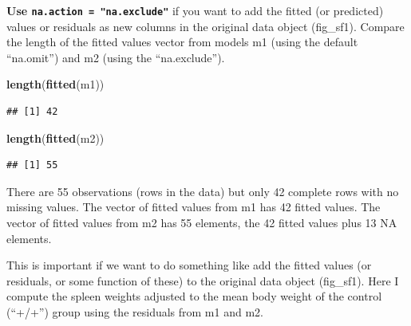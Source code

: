 \documentclass[]{book}
\newenvironment{Shaded}{\begin{snugshade}}{\end{snugshade}}
\newcommand{\KeywordTok}[1]{\textcolor[rgb]{0.13,0.29,0.53}{\textbf{#1}}}
\newcommand{\NormalTok}[1]{#1}
\begin{document}
\textbf{Use \texttt{na.action\ =\ "na.exclude"}} if you want to add the fitted (or predicted) values or residuals as new columns in the original data object (fig\_sf1). Compare the length of the fitted values vector from models m1 (using the default ``na.omit'') and m2 (using the ``na.exclude'').

\begin{Shaded}
\begin{Highlighting}[]
\KeywordTok{length}\NormalTok{(}\KeywordTok{fitted}\NormalTok{(m1))}
\end{Highlighting}
\end{Shaded}

\begin{verbatim}
## [1] 42
\end{verbatim}

\begin{Shaded}
\begin{Highlighting}[]
\KeywordTok{length}\NormalTok{(}\KeywordTok{fitted}\NormalTok{(m2))}
\end{Highlighting}
\end{Shaded}

\begin{verbatim}
## [1] 55
\end{verbatim}

There are 55 observations (rows in the data) but only 42 complete rows with no missing values. The vector of fitted values from m1 has 42 fitted values. The vector of fitted values from m2 has 55 elements, the 42 fitted values plus 13 NA elements.

This is important if we want to do something like add the fitted values (or residuals, or some function of these) to the original data object (fig\_sf1). Here I compute the spleen weights adjusted to the mean body weight of the control (``+/+'') group using the residuals from m1 and m2.
\end{document}
